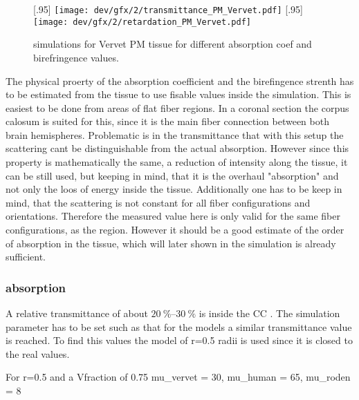 % 
\begin{figure}[!tp]
\centering
{}[.95\textwidth]{
\texttt{[image: dev/gfx/2/transmittance\_PM\_Vervet.pdf]}} %
{}[.95\textwidth]{
\texttt{[image: dev/gfx/2/retardation\_PM\_Vervet.pdf]}}
\caption{simulations for Vervet PM tissue for different absorption coef and birefringence values.}
\label{fig:parameterModelSim}
\end{figure}
% 
The physical proerty of the absorption coefficient  and the birefingence strenth \dn{} has to be estimated from the tissue to use fisable values inside the simulation.
This is easiest to be done from areas of flat fiber regions.
In a coronal section the corpus calosum is suited for this, since it is the main fiber connection between both brain hemispheres.
Problematic is in the transmittance that with this setup the scattering cant be distinguishable from the actual absorption.
However since this property is mathematically the same, a reduction of intensity along the tissue, it can be still used, but keeping in mind, that it is the overhaul "absorption" and not only the loos of energy inside the tissue.
Additionally one has to be keep in mind, that the scattering is not constant for all fiber configurations and orientations.
Therefore the measured value here is only valid for the same fiber configurations, as the region.
However it should be a good estimate of the order of absorption in the tissue, which will later shown in the simulation is already sufficient.
% 
% 
% 
\subsubsection{absorption}
% 
A relative transmittance of about $\SIrange{20}{30}{\percent}$ is inside the \ac{CC} . 
The simulation parameter has to be set such as that for the models a similar transmittance value is reached.
To find this values the model of r=0.5 radii is used since it is closed to the real values.
% 

For r=0.5 and a Vfraction of 0.75 mu\_vervet = 30, mu\_human = 65, mu\_roden = 8
% 
% 
% 
% 

